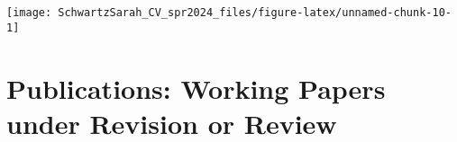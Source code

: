 \documentclass[11pt,a4paper,]{moderncv}
\begin{document}
\vspace{7mm}

\begin{center}\texttt{[image: SchwartzSarah\_CV\_spr2024\_files/figure-latex/unnamed-chunk-10-1]} \end{center}

\vspace{7mm}

\section{Publications: Working Papers under Revision or
Review}\label{publications-working-papers-under-revision-or-review}

\begingroup
\setlength{\parindent}{-0.5in}
\setlength{\leftskip}{0.5in}

\label{refs-824180ec953ff2c88ddbd95feadd10f1}
\end{document}
